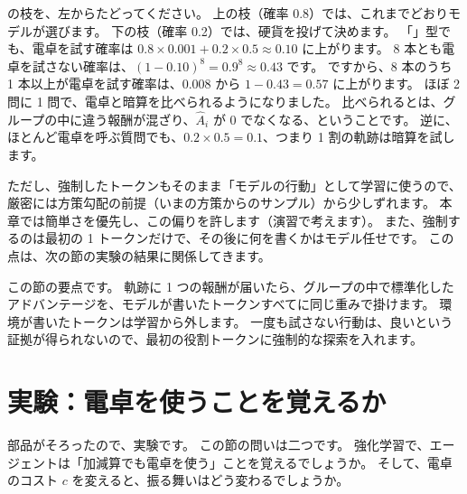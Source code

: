 の枝を、左からたどってください。
上の枝（確率 0.8）では、これまでどおりモデルが選びます。
下の枝（確率 0.2）では、硬貨を投げて決めます。
「」型でも、電卓を試す確率は $0.8\times0.001+0.2\times0.5\approx0.10$ に上がります。
8 本とも電卓を試さない確率は、$(1-0.10)^8=0.9^8\approx0.43$ です。
ですから、8 本のうち 1 本以上が電卓を試す確率は、0.008 から $1-0.43=0.57$ に上がります。
ほぼ 2 問に 1 問で、電卓と暗算を比べられるようになりました。
比べられるとは、グループの中に違う報酬が混ざり、$\hat A_i$ が 0 でなくなる、ということです。
逆に、ほとんど電卓を呼ぶ質問でも、$0.2\times0.5=0.1$、つまり 1 割の軌跡は暗算を試します。

ただし、強制したトークンもそのまま「モデルの行動」として学習に使うので、厳密には方策勾配の前提（いまの方策からのサンプル）から少しずれます。
本章では簡単さを優先し、この偏りを許します（演習で考えます）。
また、強制するのは最初の 1 トークンだけで、その後に何を書くかはモデル任せです。
この点は、次の節の実験の結果に関係してきます。

この節の要点です。
軌跡に 1 つの報酬が届いたら、グループの中で標準化したアドバンテージを、モデルが書いたトークンすべてに同じ重みで掛けます。
環境が書いたトークンは学習から外します。
一度も試さない行動は、良いという証拠が得られないので、最初の役割トークンに強制的な探索を入れます。

\section{実験：電卓を使うことを覚えるか}\label{sec:arl-exp}

部品がそろったので、実験です。
この節の問いは二つです。
強化学習で、エージェントは「加減算でも電卓を使う」ことを覚えるでしょうか。
そして、電卓のコスト $c$ を変えると、振る舞いはどう変わるでしょうか。

